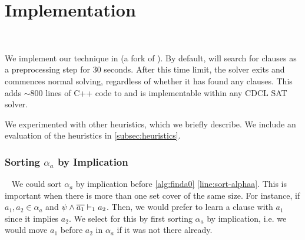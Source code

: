 \section{Implementation}~\label{sec:implementation}

We implement our technique in \tool (a fork of \cadical
). By default, \tool will search for \pr clauses as a preprocessing step for 30
seconds. After this time limit, the solver exits and commences normal solving,
regardless of whether it has found any \pr clauses. This adds $\sim\!800$ lines
of C++ code to \cadical and is implementable within any CDCL SAT solver.
 

We experimented with other heuristics, which we briefly describe.
We include an evaluation of the heuristics in \autoref{subsec:heuristics}.





\subsubsection{Sorting $\alpha_a$ by Implication}~\label{subsubsec:impordering}
We could sort $\alpha_a$ by implication before \autoref{alg:finda0}
\autoref{line:sort-alphaa}. This is important when there is more than one set
cover of the same size. For instance, if  $a_1, a_2 \in \alpha_a$ and
$\psi \land \overline{a_1} \vdash_1 a_2$. Then, we would prefer to learn a clause with 
$a_1$ since it implies $a_2$. We select for this by first sorting $\alpha_a$ by
implication, i.e. we would move $a_1$ before $a_2$ in $\alpha_a$ if it was not
there already.


